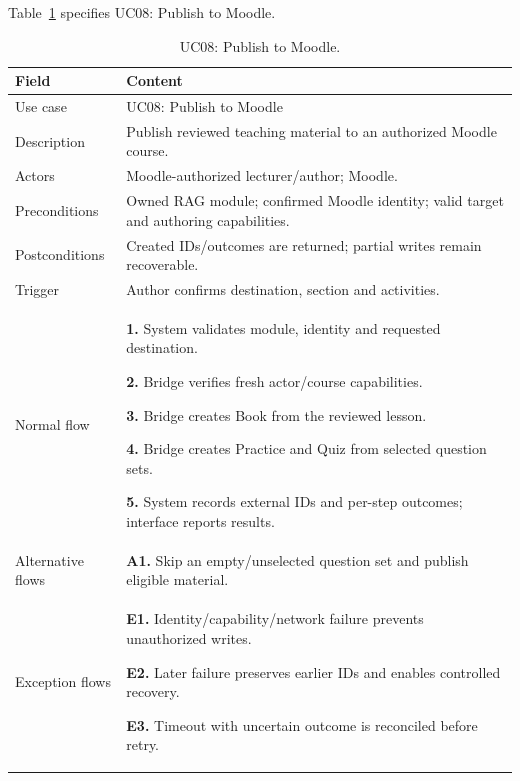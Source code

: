 \needspace{.39\textheight}
Table~\ref{tab:uc-08} specifies UC08: Publish to Moodle.
\begin{table}[H]\centering\footnotesize{}\renewcommand{\arraystretch}{1.05}
\caption{UC08: Publish to Moodle.}\label{tab:uc-08}
\begin{tabular}{|p{2.8cm}|p{11.9cm}|}\hline
\textbf{Field} & \textbf{Content}\\\hline
Use case & UC08: Publish to Moodle\\\hline
Description & Publish reviewed teaching material to an authorized Moodle course.\\\hline
Actors & Moodle-authorized lecturer/author; Moodle.\\\hline
Preconditions & Owned RAG module; confirmed Moodle identity; valid target and authoring capabilities.\\\hline
Postconditions & Created IDs/outcomes are returned; partial writes remain recoverable.\\\hline
Trigger & Author confirms destination, section and activities.\\\hline
Normal flow & \textbf{1.} System validates module, identity and requested destination.\par \textbf{2.} Bridge verifies fresh actor/course capabilities.\par \textbf{3.} Bridge creates Book from the reviewed lesson.\par \textbf{4.} Bridge creates Practice and Quiz from selected question sets.\par \textbf{5.} System records external IDs and per-step outcomes; interface reports results.\\\hline
Alternative flows & \textbf{A1.} Skip an empty/unselected question set and publish eligible material.\\\hline
Exception flows & \textbf{E1.} Identity/capability/network failure prevents unauthorized writes.\par \textbf{E2.} Later failure preserves earlier IDs and enables controlled recovery.\par \textbf{E3.} Timeout with uncertain outcome is reconciled before retry.\\\hline
\end{tabular}\end{table}

